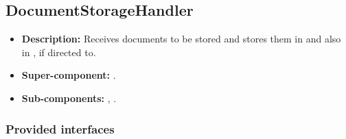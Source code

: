 \subsection{DocumentStorageHandler}
\begin{itemize}
    \item \textbf{Description:} Receives documents to be stored and stores them in  and also in , if directed to.
    \item \textbf{Super-component:} .
    \item \textbf{Sub-components:} ,  .
\end{itemize}

\subsubsection*{Provided interfaces}
